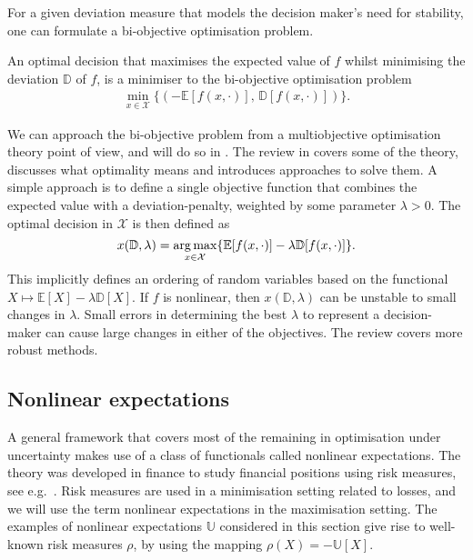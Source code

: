 \documentclass[main.tex]{subfiles}
\begin{document}
For a given deviation measure that models the decision maker's
need for stability, one can formulate a bi-objective optimisation
problem.
\begin{problem}
  An optimal decision that maximises the expected value of $f$ whilst
  minimising the deviation $\mathbb{D}$ of $f$, is a minimiser to the
  bi-objective optimisation problem
  \begin{align}
    \min_{x\in\mathcal{X}}\{(-\mathbb{E}[f(x,\cdot)],\,\mathbb{D}[f(x,\cdot)])\}.
  \end{align}
\end{problem}
We can approach the bi-objective problem from a multiobjective
optimisation theory point of view, and will do so in
.
The review in \citep{marler2004survey} covers some of the theory,
discusses what optimality means and introduces approaches to solve them.
A simple approach is to define a single objective function that combines
the expected value with a deviation-penalty, weighted by some
parameter $\lambda>0$. The optimal decision in $\mathcal{X}$ is then
defined as
\begin{equation}\label{eq:mean_dev_weighted}
  x(\mathbb{D},\lambda)=\operatorname*{arg\,max}_{x\in\mathcal{X}}\{\mathbb
  E[f(x,\cdot)]-\lambda \mathbb{D}[f(x,\cdot)]\}.
\end{equation}
This implicitly defines an ordering of random variables based on
the functional $X\mapsto \mathbb{E}[X]-\lambda \mathbb{D}[X]$.
If $f$ is nonlinear, then $x(\mathbb{D},\lambda)$ can be unstable to
small changes in $\lambda$. Small errors in determining the best
$\lambda$ to represent a decision-maker can cause large changes in
either of the objectives. The review \citep{marler2004survey} covers
more robust methods.

\subsection{Nonlinear expectations}\label{sec:nonlinear_expectations}
A general framework that covers most of the remaining
in optimisation under uncertainty makes use of a class of functionals
called nonlinear expectations.
The theory was developed in finance to study financial positions using
risk measures, see
e.g.~\citep[Ch.~4]{follmer2004stochastic}.
Risk measures are used in a minimisation setting related to losses,
and we will use the term nonlinear expectations in the maximisation
setting. The examples of nonlinear expectations $\mathbb{U}$ considered
in this section give rise to well-known risk measures $\rho$, by using the mapping
$\rho(X) = -\mathbb{U}[X]$.
\end{document}
